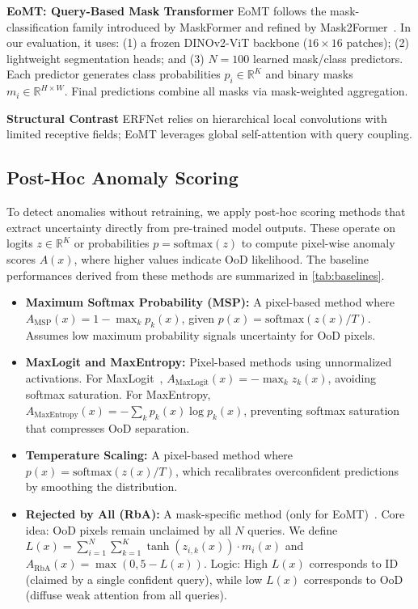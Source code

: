 \textbf{EoMT: Query-Based Mask Transformer} EoMT follows the mask-classification family introduced by MaskFormer and refined by Mask2Former~\cite{cheng2021maskformer,cheng2022mask2former}. In our evaluation, it uses: (1) a frozen DINOv2-ViT backbone ($16\times16$ patches); (2) lightweight segmentation heads; and (3) $N=100$ learned mask/class predictors. Each predictor generates class probabilities $p_i \in \mathbb{R}^K$ and binary masks $m_i \in \mathbb{R}^{H \times W}$. Final predictions combine all masks via mask-weighted aggregation.

\textbf{Structural Contrast} ERFNet relies on hierarchical local convolutions with limited receptive fields; EoMT leverages global self-attention with query coupling.

\subsection{Post-Hoc Anomaly Scoring}

To detect anomalies without retraining, we apply post-hoc scoring methods that extract uncertainty directly from pre-trained model outputs. These operate on logits $z \in \mathbb{R}^K$ or probabilities $p = \text{softmax}(z)$ to compute pixel-wise anomaly scores $A(x)$, where higher values indicate OoD likelihood. The baseline performances derived from these methods are summarized in \cref{tab:baselines}.

\begin{itemize}
\item \textbf{Maximum Softmax Probability (MSP):} A pixel-based method where $A_{\text{MSP}}(x) = 1 - \max_k p_k(x)$, given $p(x) = \text{softmax}(z(x)/T)$. Assumes low maximum probability signals uncertainty for OoD pixels.
\item \textbf{MaxLogit and MaxEntropy:} Pixel-based methods using unnormalized activations. For MaxLogit~\cite{hendrycks2022scaling}, $A_{\text{MaxLogit}}(x) = -\max_k z_k(x)$, avoiding softmax saturation. For MaxEntropy, $A_{\text{MaxEntropy}}(x) = -\sum_k p_k(x) \log p_k(x)$, preventing softmax saturation that compresses OoD separation.
\item \textbf{Temperature Scaling:} A pixel-based method where $p(x) = \text{softmax}(z(x)/T)$, which recalibrates overconfident predictions by smoothing the distribution.
\item \textbf{Rejected by All (RbA):} A mask-specific method (only for EoMT)~\cite{nayal2023rba}. Core idea: OoD pixels remain unclaimed by all $N$ queries. We define $L(x) = \sum_{i=1}^N \sum_{k=1}^K \tanh(z_{i,k}(x)) \cdot m_i(x)$ and $A_{\text{RbA}}(x) = \max(0, 5 - L(x))$. Logic: High $L(x)$ corresponds to ID (claimed by a single confident query), while low $L(x)$ corresponds to OoD (diffuse weak attention from all queries).
\end{itemize}

